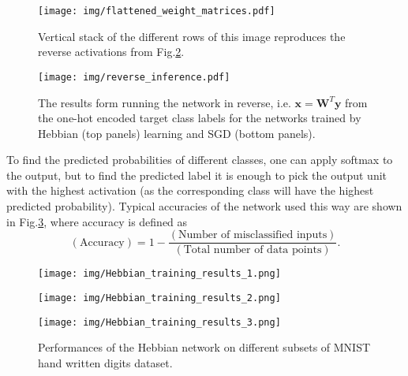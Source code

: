 \documentclass[a4paper, 11pt]{article}
\begin{document}
\begin{figure}
  \begin{center}
    \texttt{[image: img/flattened\_weight\_matrices.pdf]}
  \end{center}  
  \caption{Vertical stack of the different rows of this image reproduces the reverse activations from Fig.\ref{fig:reverse_inference}.}
  \label{fig:flattened_weight_matrices}
\end{figure}


\begin{figure}
  \begin{center}
    \texttt{[image: img/reverse\_inference.pdf]}
  \end{center}  
  \caption{The results form running the network in reverse, i.e. $\mathbf x = \mathbf W^T\mathbf y$ from the one-hot encoded target class labels for the networks trained by Hebbian (top panels) learning and SGD (bottom panels).}
  \label{fig:reverse_inference}
\end{figure}

To find the predicted probabilities of different classes, one can apply softmax to the output, but to find the predicted label it is enough to pick the output unit with the highest activation (as the corresponding class will have the highest predicted probability). Typical accuracies of the network used this way are shown in Fig.\ref{accuracies_of_Hebbian_model}, where accuracy is defined as
\begin{equation}
  (\text{Accuracy}) = 1 - \frac{(\text{Number of misclassified inputs})}{(\text{Total number of data points})}.
\end{equation}

\begin{figure}
    \centering
    \begin{minipage}{.33\textwidth}
        \centering
        \texttt{[image: img/Hebbian\_training\_results\_1.png]}
    \end{minipage}\hfill
    \begin{minipage}{.33\textwidth}
        \centering
        \texttt{[image: img/Hebbian\_training\_results\_2.png]}
    \end{minipage}\hfill
    \begin{minipage}{.33\textwidth}
        \centering
        \texttt{[image: img/Hebbian\_training\_results\_3.png]}
    \end{minipage}
    \caption{Performances of the Hebbian network on different subsets of MNIST hand written digits dataset.}
    \label{accuracies_of_Hebbian_model}
\end{figure}
\end{document}
